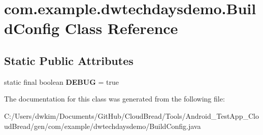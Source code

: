 \hypertarget{classcom_1_1example_1_1dwtechdaysdemo_1_1_build_config}{}\section{com.\+example.\+dwtechdaysdemo.\+Build\+Config Class Reference}
\label{classcom_1_1example_1_1dwtechdaysdemo_1_1_build_config}
\subsection*{Static Public Attributes}
\begin{DoxyCompactItemize}
\item 
static final boolean {\bfseries D\+E\+B\+UG} = true\hypertarget{classcom_1_1example_1_1dwtechdaysdemo_1_1_build_config_a50181a140684170980ee09094097c661}{}\label{classcom_1_1example_1_1dwtechdaysdemo_1_1_build_config_a50181a140684170980ee09094097c661}

\end{DoxyCompactItemize}


The documentation for this class was generated from the following file\+:\begin{DoxyCompactItemize}
\item 
C\+:/\+Users/dwkim/\+Documents/\+Git\+Hub/\+Cloud\+Bread/\+Tools/\+Android\+\_\+\+Test\+App\+\_\+\+Cloud\+Bread/gen/com/example/dwtechdaysdemo/Build\+Config.\+java\end{DoxyCompactItemize}
